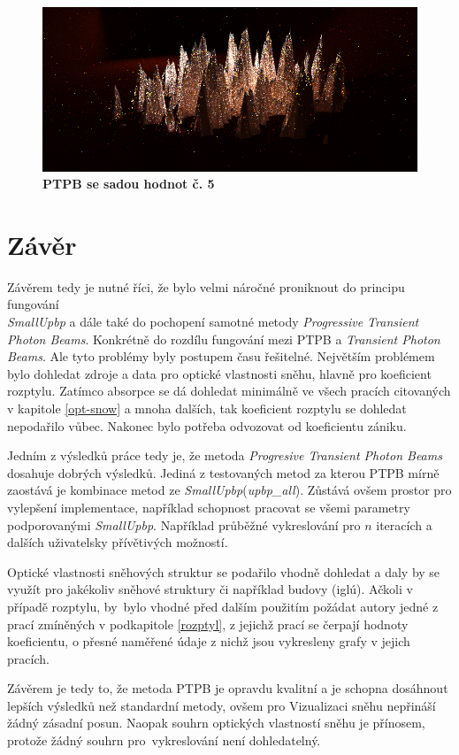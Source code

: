 \begin{figure}[H]\centering
\includegraphics[width=1\linewidth]{obrazky-figures/test-ptpb-5-2h.png}\hfill
  \caption{\textbf{PTPB se sadou hodnot č. 5}}
  \label{mereni-6-ptpb}
\end{figure}
\chapter{Závěr}
Závěrem tedy je nutné říci, že bylo velmi náročné proniknout do principu fungování\\ \textit{SmallUpbp} a dále také do pochopení samotné metody \textit{Progressive Transient Photon Beams}. Konkrétně do rozdílu fungování mezi PTPB a \textit{Transient Photon Beams}. Ale tyto problémy byly postupem času řešitelné. Největším problémem bylo dohledat zdroje a data pro optické vlastnosti sněhu, hlavně pro koeficient rozptylu. Zatímco absorpce se dá dohledat minimálně ve všech pracích citovaných v kapitole \ref{opt-snow} a mnoha dalších, tak koeficient rozptylu se dohledat nepodařilo vůbec. Nakonec bylo potřeba odvozovat od koeficientu zániku.

Jedním z výsledků práce tedy je, že metoda \textit{Progresive Transient Photon Beams} dosahuje dobrých výsledků. Jediná z testovaných metod za kterou PTPB mírně zaostává je kombinace metod ze \textit{SmallUpbp}(\textit{upbp\_all}). Zůstává ovšem prostor pro vylepšení implementace, například schopnost pracovat se všemi parametry podporovanými \textit{SmallUpbp}. Například průběžné vykreslování pro $n$ iteracích a dalších uživatelsky přívětivých možností.

Optické vlastnosti sněhových struktur se podařilo vhodně dohledat a daly by se využít pro jakékoliv sněhové struktury či například budovy (iglú). Ačkoli v případě rozptylu, by~bylo vhodné před dalším použitím požádat autory jedné z prací zmíněných v podkapitole \ref{rozptyl}, z jejichž prací se čerpají hodnoty koeficientu, o přesné naměřené údaje z nichž jsou vykresleny grafy v jejich pracích.

Závěrem je tedy to, že metoda PTPB je opravdu kvalitní a je schopna dosáhnout lepších výsledků než standardní metody, ovšem pro Vizualizaci sněhu nepřináší žádný zásadní posun. Naopak souhrn optických vlastností sněhu je přínosem, protože žádný souhrn pro~vykreslování není dohledatelný.
